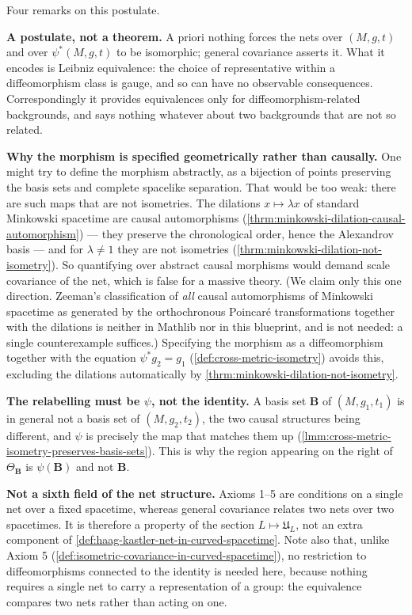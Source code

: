 Four remarks on this postulate.

\textbf{A postulate, not a theorem.} A priori nothing forces the nets over $(M,g,t)$ and over $\psi^*(M,g,t)$ to be isomorphic; general covariance asserts it. What it encodes is Leibniz equivalence: the choice of representative within a diffeomorphism class is gauge, and so can have no observable consequences. Correspondingly it provides equivalences only for diffeomorphism-related backgrounds, and says nothing whatever about two backgrounds that are not so related.

\textbf{Why the morphism is specified geometrically rather than causally.} One might try to define the morphism abstractly, as a bijection of points preserving the basis sets and complete spacelike separation. That would be too weak: there are such maps that are not isometries. The dilations $x \mapsto \lambda x$ of standard Minkowski spacetime are causal automorphisms (\ref{thrm:minkowski-dilation-causal-automorphism}) --- they preserve the chronological order, hence the Alexandrov basis --- and for $\lambda \neq 1$ they are not isometries (\ref{thrm:minkowski-dilation-not-isometry}). So quantifying over abstract causal morphisms would demand scale covariance of the net, which is false for a massive theory. (We claim only this one direction. Zeeman's classification of \emph{all} causal automorphisms of Minkowski spacetime as generated by the orthochronous Poincar\'e transformations together with the dilations is neither in Mathlib nor in this blueprint, and is not needed: a single counterexample suffices.) Specifying the morphism as a diffeomorphism together with the equation $\psi^*g_2 = g_1$ (\ref{def:cross-metric-isometry}) avoids this, excluding the dilations automatically by \ref{thrm:minkowski-dilation-not-isometry}.

\textbf{The relabelling must be $\psi$, not the identity.} A basis set $\mathbf{B}$ of $(M,g_1,t_1)$ is in general not a basis set of $(M,g_2,t_2)$, the two causal structures being different, and $\psi$ is precisely the map that matches them up (\ref{lmm:cross-metric-isometry-preserves-basis-sets}). This is why the region appearing on the right of $\Theta_{\mathbf{B}}$ is $\psi(\mathbf{B})$ and not $\mathbf{B}$.

\textbf{Not a sixth field of the net structure.} Axioms 1--5 are conditions on a single net over a fixed spacetime, whereas general covariance relates two nets over two spacetimes. It is therefore a property of the section $L \mapsto \mathfrak{U}_L$, not an extra component of \ref{def:haag-kastler-net-in-curved-spacetime}. Note also that, unlike Axiom 5 (\ref{def:isometric-covariance-in-curved-spacetime}), no restriction to diffeomorphisms connected to the identity is needed here, because nothing requires a single net to carry a representation of a group: the equivalence compares two nets rather than acting on one.
